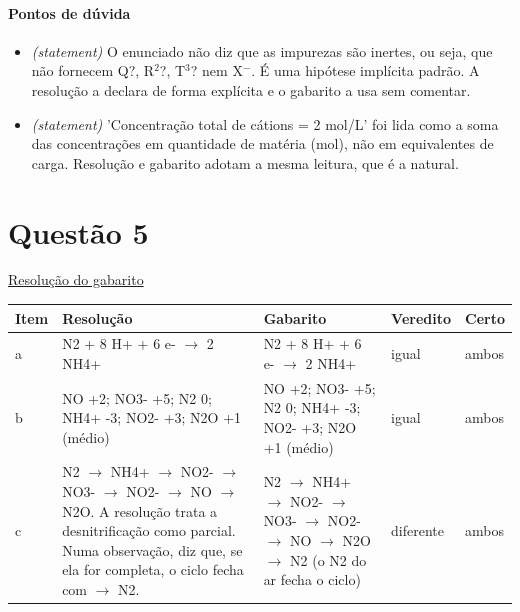 \documentclass{article}%
\begin{document}
\paragraph{Pontos de dúvida}%
\begin{itemize}%
\item%
\textit{(statement)} O enunciado não diz que as impurezas são inertes, ou seja, que não fornecem Q?, R$^2$?, T$^3$? nem X$^{-}$. É uma hipótese implícita padrão. A resolução a declara de forma explícita e o gabarito a usa sem comentar.%
\item%
\textit{(statement)} 'Concentração total de cátions = 2 mol/L' foi lida como a soma das concentrações em quantidade de matéria (mol), não em equivalentes de carga. Resolução e gabarito adotam a mesma leitura, que é a natural.%
\end{itemize}%
\section*{Questão 5}%
\href{https://poliedroresolve.sistemapoliedro.com.br/vestibulares/ita/2027/ita-2-fase-dia-2-21-10-2026-2-fase-dia-2/dissertativa-5-quimica-2-fase-dia-2-ita-2027}{Resolução do gabarito}\par\smallskip%
\begin{longtable}{@{}p{} p{} p{} p{} p{}@{}}\toprule Item & Resolução & Gabarito & Veredito & Certo \\ \midrule
a & N2 + 8 H+ + 6 e- $\to$ 2 NH4+ & N2 + 8 H+ + 6 e- $\to$ 2 NH4+ & igual & ambos \\
b & NO +2; NO3- +5; N2 0; NH4+ -3; NO2- +3; N2O +1 (médio) & NO +2; NO3- +5; N2 0; NH4+ -3; NO2- +3; N2O +1 (médio) & igual & ambos \\
c & N2 $\to$ NH4+ $\to$ NO2- $\to$ NO3- $\to$ NO2- $\to$ NO $\to$ N2O. A resolução trata a desnitrificação como parcial. Numa observação, diz que, se ela for completa, o ciclo fecha com $\to$ N2. & N2 $\to$ NH4+ $\to$ NO2- $\to$ NO3- $\to$ NO2- $\to$ NO $\to$ N2O $\to$ N2 (o N2 do ar fecha o ciclo) & diferente & ambos \\
\bottomrule\end{longtable}%
\end{document}
